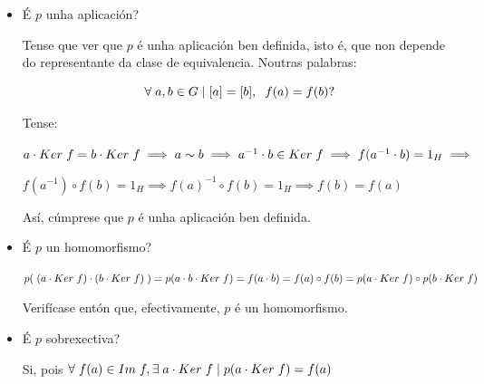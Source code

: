 \documentclass[twoside]{report}
\theoremstyle{mystyle}
\begin{document}
\begin{itemize}
    \item É $p$ unha aplicación?
    
    Tense que ver que $p$ é unha aplicación ben definida, isto é, que non depende do representante da clase de equivalencia. Noutras palabras: 
    
    $$\forall \hspace{1mm} a,b \in G \hspace{1mm} | \hspace{1mm} [a] = [b], \hspace{2mm} f(a) = f(b) ? $$
    
    Tense: 
    
    \begin{center}
    $a \cdot Ker \hspace{1mm} f = b \cdot Ker \hspace{1mm} f \implies a \sim b \implies a^{-1} \cdot b \in Ker \hspace{1mm} f \implies f(a^{-1} \cdot b) = 1_{H} \implies $
    \end{center}
    \begin{center}
        $f(a^{-1}) \circ f(b) = 1_{H} \implies f(a)^{-1} \circ f(b) = 1_{H} \implies f(b) = f(a)$
    \end{center}
    
    Así, cúmprese que $p$ é unha aplicación ben definida.\\
    
    \item É $p$ un homomorfismo?
    
    $p( \hspace{1mm} (a \cdot Ker \hspace{1mm} f) \cdot (b \cdot Ker \hspace{1mm} f) \hspace{1mm} ) = p(a \cdot b \cdot Ker \hspace{1mm} f) = f(a \cdot b) = f(a) \circ f(b) = p(a \cdot Ker \hspace{1mm} f) \circ p(b \cdot Ker \hspace{1mm} f)$
    
    Verifícase entón que, efectivamente, $p$ é un homomorfismo.\\
    
    \item É $p$ sobrexectiva?
    
    Si, pois \hspace{2mm} $\forall \hspace{1mm} f(a) \in Im \hspace{1mm} f, \exists \hspace{1mm} a \cdot Ker \hspace{1mm} f \hspace{1mm} | \hspace{1mm} p( a \cdot Ker \hspace{1mm} f) = f(a)$\\ 
    

\end{itemize}
\end{document}
